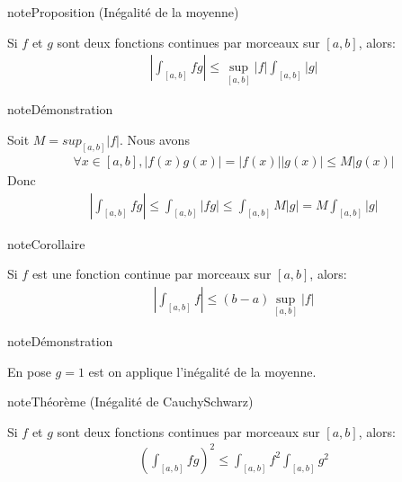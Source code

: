 \documentclass[letterpaper,10pt,french]{sphinxmanual}
\begin{document}
\begin{sphinxadmonition}{note}{Proposition (Inégalité de la moyenne)}

\sphinxAtStartPar
Si \(f\) et \(g\) sont deux fonctions continues par morceaux sur \([a, b]\), alors:
\begin{equation*}
\begin{split}
\left |\int_{[a, b]}fg \right | \leq \sup_{[a, b]} |f| \int_{[a, b]}|g|
\end{split}
\end{equation*}\end{sphinxadmonition}

\begin{sphinxadmonition}{note}{Démonstration}

\sphinxAtStartPar
Soit \(M = sup_{[a,b]}|f|\).
Nous avons
\begin{equation*}
\begin{split}
\forall x \in [a, b], |f(x)g(x)|=|f(x)||g(x)| \leq M |g(x)|
\end{split}
\end{equation*}
\sphinxAtStartPar
Donc
\begin{equation*}
\begin{split}
\left |\int_{[a, b]}fg \right | \leq \int_{[a, b]}|fg| \leq \int_{[a, b]}M|g| =M\int_{[a, b]}|g|
\end{split}
\end{equation*}\end{sphinxadmonition}

\begin{sphinxadmonition}{note}{Corollaire}

\sphinxAtStartPar
Si \(f\) est une fonction continue par morceaux sur \([a, b]\), alors:
\begin{equation*}
\begin{split}
\left |\int_{[a, b]}f \right | \leq (b-a)  \sup_{[a, b]}|f|
\end{split}
\end{equation*}\end{sphinxadmonition}

\begin{sphinxadmonition}{note}{Démonstration}

\sphinxAtStartPar
En pose \(g=1\) est on applique l’inégalité de la moyenne.
\end{sphinxadmonition}

\begin{sphinxadmonition}{note}{Théorème (Inégalité de Cauchy\sphinxhyphen{}Schwarz)}

\sphinxAtStartPar
Si \(f\) et \(g\) sont deux fonctions continues par morceaux sur \([a, b]\), alors:
\begin{equation*}
\begin{split}
\left (\int_{[a, b]}fg \right ) ^2 \leq \int_{[a, b]} f^2 \int_{[a, b]}g^2
\end{split}
\end{equation*}\end{sphinxadmonition}
\end{document}
